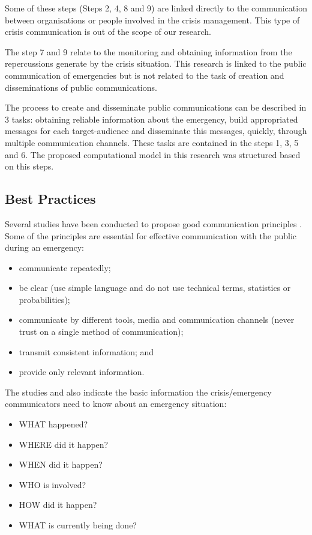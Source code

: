 Some of these steps (Steps 2, 4, 8 and 9) are linked directly to the communication between organisations or people involved in the crisis management. This type of crisis communication is out of the scope of our research.

The step 7 and 9 relate to the monitoring and obtaining information from the repercussions generate by the crisis situation. This research is linked to the public communication of emergencies but is not related to the task of creation and disseminations of public communications.

The process to create and disseminate public communications can be described in 3 tasks: obtaining reliable information about the emergency, build appropriated messages for each target-audience and disseminate this messages, quickly, through multiple communication channels. These tasks are contained in the steps 1, 3, 5 and 6. The proposed computational model in this research was structured based on this steps.

 
  \subsection{Best Practices}
  
  Several studies have been conducted to propose good communication principles \cite{cdc2014} \cite{seeger2006best} \cite{goldfine2011best} \cite{glik2007} \cite{tinker2010} \cite{panamericanhealthorganization2009}.  Some of the principles are essential for effective communication with the public during an emergency:
  
  \begin{itemize}
   \item communicate repeatedly;
   \item be clear (use simple language and do not use technical terms, statistics or probabilities);
   \item communicate by different tools, media and communication channels (never trust on a single method of communication);
   \item transmit consistent information; and
   \item provide only relevant information.
   
 \end{itemize}
 
 The studies \cite{cdc2014} and \cite{cisvGuide} also indicate the basic information the crisis/emergency communicators need to know about an emergency situation:
 
 \begin{itemize}
   \item WHAT happened?
   \item WHERE did it happen?
   \item WHEN did it happen?
   \item WHO is involved?
   \item HOW did it happen?
   \item WHAT is currently being done?
      
 \end{itemize}
 
